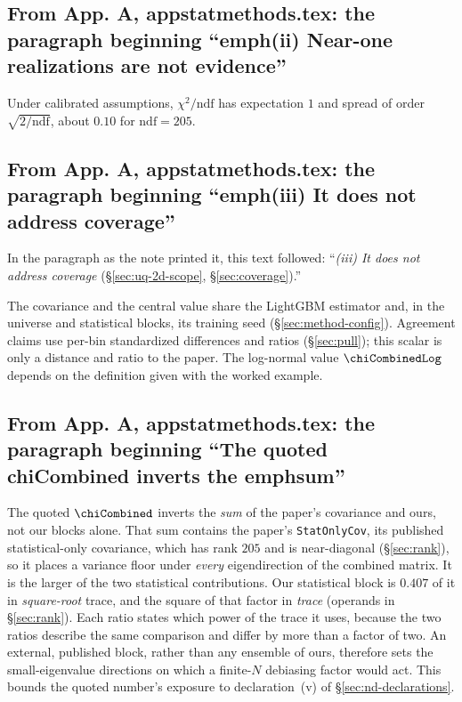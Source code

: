 \subsection{From App. A, appstatmethods.tex: the paragraph beginning ``emph(ii) Near-one realizations are not evidence''}
Under calibrated assumptions, $\chi^{2}/\mathrm{ndf}$ has expectation $1$ and spread of order $\sqrt{2/\mathrm{ndf}}$, about $0.10$ for $\mathrm{ndf}=205$.

\subsection{From App. A, appstatmethods.tex: the paragraph beginning ``emph(iii) It does not address coverage''}
In the paragraph as the note printed it, this text followed: ``\emph{(iii) It does not address coverage} (\S\ref{sec:uq-2d-scope}, \S\ref{sec:coverage}).''\par
The covariance and the central value share the LightGBM estimator and, in the universe and statistical blocks, its training seed (\S\ref{sec:method-config}). Agreement claims use per-bin standardized differences and ratios (\S\ref{sec:pull}); this scalar is only a distance and ratio to the paper. The log-normal value $\chiCombinedLog$ depends on the definition given with the worked example.

\subsection{From App. A, appstatmethods.tex: the paragraph beginning ``The quoted chiCombined inverts the emphsum''}
The quoted $\chiCombined$ inverts the \emph{sum} of the paper's covariance and ours, not our blocks alone. That sum contains the paper's \texttt{StatOnlyCov}, its published statistical-only covariance, which has rank $205$ and is near-diagonal (\S\ref{sec:rank}), so it places a variance floor under \emph{every} eigendirection of the combined matrix. It is the larger of the two statistical contributions. Our statistical block is $0.407$ of it in \emph{square-root} trace, and the square of that factor in \emph{trace} (operands in \S\ref{sec:rank}). Each ratio states which power of the trace it uses, because the two ratios describe the same comparison and differ by more than a factor of two. An external, published block, rather than any ensemble of ours, therefore sets the small-eigenvalue directions on which a finite-$N$ debiasing factor would act. This bounds the quoted number's exposure to declaration~(v) of \S\ref{sec:nd-declarations}.

